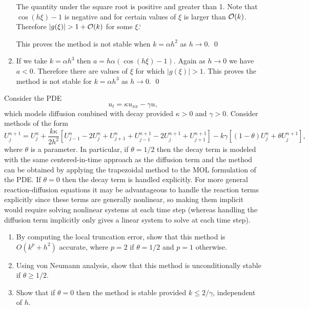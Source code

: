 \documentclass[10pt]{article}
\begin{document}
\begin{solution}[Solution]
\begin{enumerate}[label=(\alph*)]
    The quantity under the square root is positive and greater than 1. Note that \( \cos( h \xi) - 1 \) is negative and for certain values of \( \xi \) is larger than \( \mathcal{O}(k) \). Therefore \( |g(\xi)| > 1+ \mathcal{O}(k) \) for some \( \xi \).`

    This proves the method is not stable when \( k = \alpha h^2 \) as \( h\to 0 \). \qed

    \item
    If we take \( k = \alpha h^3 \) then \( a = h\alpha(\cos(h\xi)-1) \). Again as \( h\to 0 \) we have \( a < 0 \).
    Therefore there are values of \( \xi \) for which \( |g(\xi)| > 1 \). This proves the method is not stable for  \( k = \alpha h^3 \) as \( h\to 0 \). \qed


\end{enumerate}


\end{solution}

\begin{problem}[Problem 2]
Consider the PDE
\[
u_t = \kappa u_{xx} - \gamma u ,
\]
which models diffusion combined with decay provided \(\kappa > 0\) and \(\gamma > 0\).
Consider methods of the form
\[
U_j^{n+1} = U_j^n + \frac{k \kappa}{2 h^2} [ U_{j-1}^n - 2 U_j^n + U_{j+1}^n + U_{j-1}^{n+1} -
2 U_j^{n+1} + U_{j+1}^{n+1} ] - k \gamma [ (1 - \theta ) U_j^n + \theta U_j^{n+1} ] ,
\]
where \(\theta\) is a parameter.  In particular, if \(\theta = 1/2\) then the decay term is modeled with the same centered-in-time approach as the diffusion term and the method can be obtained by applying the trapezoidal method to the MOL formulation of the PDE.  If \(\theta = 0\) then the decay term is handled explicitly.  For more general reaction-diffusion equations it may be advantageous to handle the reaction terms explicitly since these terms are generally nonlinear, so making them implicit would require solving nonlinear systems at each time step (whereas handling the diffusion term implicitly only gives a linear system to solve at each time step).
\begin{enumerate}[label=(\alph*)]
\item
By computing the local truncation error, show that this method is \(O( k^p + h^2 )\) accurate,
where \(p = 2\) if \(\theta = 1/2\) and \(p = 1\) otherwise.
\item
Using von Neumann analysis, show that this method is unconditionally stable if \(\theta \geq 1/2\).
\item
Show that if \(\theta = 0\) then the method is stable provided \(k \leq 2/ \gamma\), independent of \(h\).
\end{enumerate}
\end{problem}
\end{document}
